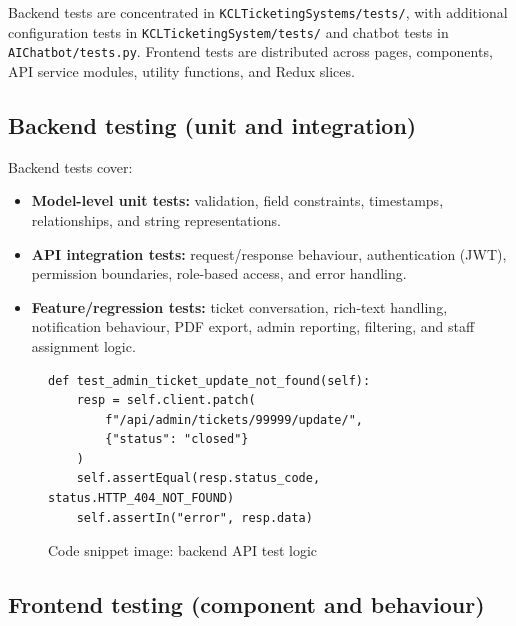 Backend tests are concentrated in \texttt{KCLTicketingSystems/tests/}, with additional configuration tests in \texttt{KCLTicketingSystem/tests/} and chatbot tests in \texttt{AIChatbot/tests.py}. Frontend tests are distributed across pages, components, API service modules, utility functions, and Redux slices.

\subsection{Backend testing (unit and integration)}

Backend tests cover:
\begin{itemize}
	\item \textbf{Model-level unit tests:} validation, field constraints, timestamps, relationships, and string representations.
	\item \textbf{API integration tests:} request/response behaviour, authentication (JWT), permission boundaries, role-based access, and error handling.
	\item \textbf{Feature/regression tests:} ticket conversation, rich-text handling, notification behaviour, PDF export, admin reporting, filtering, and staff assignment logic.
\end{itemize}

\begin{figure}[H]
\centering
\begin{minipage}{0.93\textwidth}
\begin{lstlisting}[caption={Backend API integration test example (admin edge-case handling)}]
def test_admin_ticket_update_not_found(self):
	resp = self.client.patch(
		f"/api/admin/tickets/99999/update/",
		{"status": "closed"}
	)
	self.assertEqual(resp.status_code, status.HTTP_404_NOT_FOUND)
	self.assertIn("error", resp.data)
\end{lstlisting}
\end{minipage}
\caption{Code snippet image: backend API test logic}
\label{fig:backend-test-snippet}
\end{figure}

\subsection{Frontend testing (component and behaviour)}

